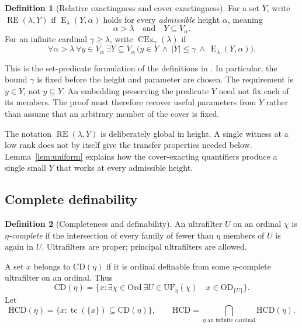 \documentclass[11pt,letterpaper]{article}
\theoremstyle{definition}
\newtheorem{definition}{Definition}[section]
\newcommand{\OD}{\mathrm{OD}}
\newcommand{\CEx}{\operatorname{CEx}}
\newcommand{\Ord}{\mathrm{Ord}}
\newcommand{\CD}{\mathrm{CD}}
\newcommand{\HCD}{\mathrm{HCD}}
\newcommand{\UF}{\mathrm{UF}}
\newcommand{\RE}{\operatorname{RE}}
\newcommand{\Erel}{\operatorname{E}}
\newcommand{\tc}{\operatorname{tc}}
\begin{document}
\begin{definition}[Relative exactingness and cover exactingness]\label{def:cex}
For a set $Y$, write $\RE(\lambda,Y)$ if $\Erel_\lambda(Y,\alpha)$ holds for every \emph{admissible} height $\alpha$, meaning
\[
\alpha>\lambda\quad\text{and}\quad Y\subseteq V_\alpha.
\]
For an infinite cardinal $\gamma\ge\lambda$, write $\CEx_\gamma(\lambda)$ if
\begin{equation}\label{eq:cex-definition}
\forall\alpha>\lambda\ \forall y\in V_\alpha\ \exists Y\subseteq V_\alpha\,
\bigl(y\in Y\ \wedge\ |Y|\le\gamma\ \wedge\ \Erel_\lambda(Y,\alpha)\bigr).
\end{equation}
\end{definition}

This is the set-predicate formulation of the definitions in \cite[Definitions 2.6, 3.1, and 3.2]{cover}. In particular, the bound $\gamma$ is fixed before the height and parameter are chosen. The requirement is $y\in Y$, not $y\subseteq Y$. An embedding preserving the predicate $Y$ need not fix each of its members. The proof must therefore recover useful parameters from $Y$ rather than assume that an arbitrary member of the cover is fixed.

The notation $\RE(\lambda,Y)$ is deliberately global in height. A single witness at a low rank does not by itself give the transfer properties needed below. Lemma~\ref{lem:uniform} explains how the cover-exacting quantifiers produce a single small $Y$ that works at every admissible height.

\subsection{Complete definability}

\begin{definition}[Completeness and definability]\label{def:cd}
An ultrafilter $U$ on an ordinal $\chi$ is \emph{$\eta$-complete} if the intersection of every family of fewer than $\eta$ members of $U$ is again in $U$. Ultrafilters are proper; principal ultrafilters are allowed.

A set $x$ belongs to $\CD(\eta)$ if it is ordinal definable from some $\eta$-complete ultrafilter on an ordinal. Thus
\[
\CD(\eta)=\{x:\exists\chi\in\Ord\ \exists U\in\UF_\eta(\chi)\quad
x\in\OD_{\{U\}}\}.
\]
Let
\[
\HCD(\eta)=\{x:\tc(\{x\})\subseteq\CD(\eta)\},
\qquad
\HCD=\bigcap_{\eta\text{ an infinite cardinal}}\HCD(\eta).
\]
\end{definition}
\end{document}
